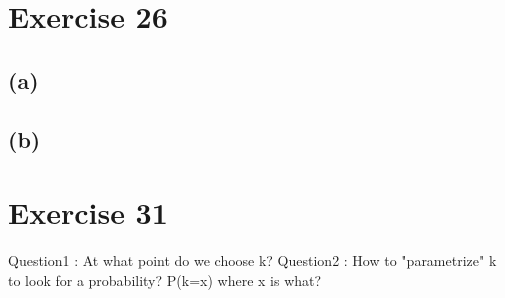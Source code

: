 \documentclass{article}
\begin{document}
\section*{Exercise 26}
\subsection*{(a)}


\subsection*{(b)}

\section*{Exercise 31}

Question1 : At what point do we choose k?
Question2 : How to "parametrize" k to look for a probability? P(k=x) where x is what?
\end{document}
